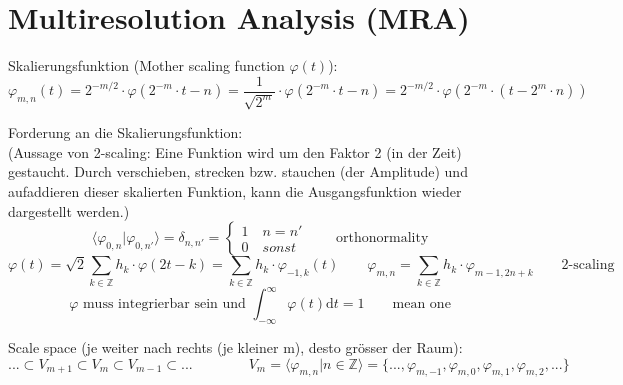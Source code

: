 \section{Multiresolution Analysis (MRA)}





Skalierungsfunktion (Mother scaling function $\varphi(t)$): 
\[
	\varphi_{m,n}(t)=2^{-m/2} \cdot \varphi(2^{-m}\cdot t - n) = \frac{1}{\sqrt{2^{m}}} \cdot \varphi(2^{-m}\cdot t -n) = 2^{-m/2} \cdot \varphi(2^{-m}\cdot (t - 2^{m}\cdot n))
\]

Forderung an die Skalierungsfunktion:\\
(Aussage von 2-scaling: Eine Funktion wird um den Faktor 2 (in der Zeit) gestaucht. Durch verschieben, strecken bzw. stauchen (der Amplitude) und aufaddieren dieser skalierten Funktion, kann die  Ausgangsfunktion wieder dargestellt werden.)
\[
	\langle \varphi_{0,n}|\varphi_{0,n'} \rangle = \delta_{n,n'} =  \begin{cases} 1 \quad n=n'\\ 0 \quad sonst  \end{cases}  \qquad \text{orthonormality} 
\]
\[
	\varphi(t) = \sqrt{2} \sum_{k \in \mathbb{Z}} h_k \cdot \varphi(2t-k) = \sum_{k \in \mathbb{Z}} h_k \cdot \varphi_{-1,k}(t) \qquad \varphi_{m,n}=\sum_{k \in \mathbb{Z}} h_k \cdot \varphi_{m-1,2n+k} \qquad \text{2-scaling}  
\]
\[
	\varphi \text{ muss integrierbar sein und } \int_{-\infty}^{\infty}\varphi(t) \mathrm{d}t = 1  \qquad \text{mean one}  
\] 


Scale space (je weiter nach rechts (je kleiner m), desto grösser der Raum): 
\[
	...\subset V_{m+1} \subset V_{m} \subset V_{m-1} \subset ...
	\qquad \qquad
	V_m = \langle \varphi_{m,n}|n \in \mathbb{Z}  \rangle = \{ ...,\varphi_{m,-1},\varphi_{m,0}, \varphi_{m,1}, \varphi_{m,2},... \}
\]

